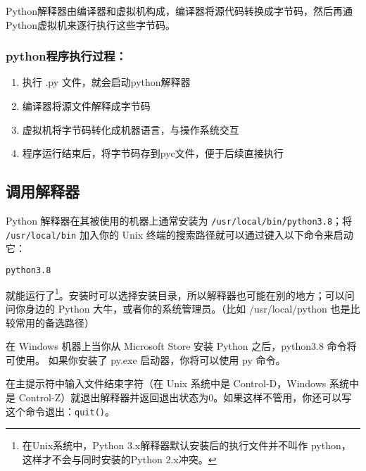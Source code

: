 
\begin{issues}
\issueTODO
\issueDraft
\end{issues}


Python解释器由编译器和虚拟机构成，编译器将源代码转换成字节码，然后再通Python虚拟机来逐行执行这些字节码。

\subsubsection{python程序执行过程：}

\begin{enumerate}
\item 执行 .py 文件，就会启动python解释器

\item 编译器将源文件解释成字节码

\item 虚拟机将字节码转化成机器语言，与操作系统交互

\item 程序运行结束后，将字节码存到pyc文件，便于后续直接执行
\end{enumerate}

\subsection{调用解释器}
Python 解释器在其被使用的机器上通常安装为 \verb|/usr/local/bin/python3.8|；将 \verb|/usr/local/bin| 加入你的 Unix 终端的搜索路径就可以通过键入以下命令来启动它：

\begin{lstlisting}[language=bash]
python3.8
\end{lstlisting}

就能运行了\footnote{在Unix系统中，Python 3.x解释器默认安装后的执行文件并不叫作 python，这样才不会与同时安装的Python 2.x冲突。}。安装时可以选择安装目录，所以解释器也可能在别的地方；可以问问你身边的 Python 大牛，或者你的系统管理员。（比如 /usr/local/python 也是比较常用的备选路径）

在 Windows 机器上当你从 Microsoft Store 安装 Python 之后，python3.8 命令将可使用。 如果你安装了 py.exe 启动器，你将可以使用 py 命令。

在主提示符中输入文件结束字符（在 Unix 系统中是 Control-D，Windows 系统中是 Control-Z）就退出解释器并返回退出状态为0。如果这样不管用，你还可以写这个命令退出：\verb|quit()|。

